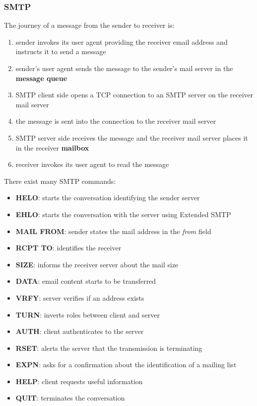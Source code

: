 \documentclass{article}
\begin{document}
\subsubsection{SMTP}
The journey of a message from the sender to receiver is:
\begin{enumerate}
    \item sender invokes its user agent providing the receiver email address and instructs it to send a message
    \item sender's user agent sends the message to the sender's mail server in the \textbf{message queue}
    \item SMTP client side opens a TCP connection to an SMTP server on the receiver mail server
    \item the message is sent into the connection to the receiver mail server
    \item SMTP server side receives the message and the receiver mail server places it in the receiver \textbf{mailbox}
    \item receiver invokes its user agent to read the message
\end{enumerate}
There exist many SMTP commands:
\begin{itemize}
    \item \textbf{HELO}: starts the conversation identifying the sender server
    \item \textbf{EHLO}: starts the conversation with the server using Extended SMTP
    \item \textbf{MAIL FROM}: sender states the mail address in the \textit{from} field
    \item \textbf{RCPT TO}: identifies the receiver
    \item \textbf{SIZE}: informs the receiver server about the mail size
    \item \textbf{DATA}: email content starts to be transferred
    \item \textbf{VRFY}: server verifies if an address exists
    \item \textbf{TURN}: inverts roles between client and server
    \item \textbf{AUTH}: client authenticates to the server
    \item \textbf{RSET}: alerts the server that the transmission is terminating
    \item \textbf{EXPN}: asks for a confirmation about the identification of a mailing list
    \item \textbf{HELP}: client requests useful information
    \item \textbf{QUIT}: terminates the conversation
\end{itemize}
\end{document}
